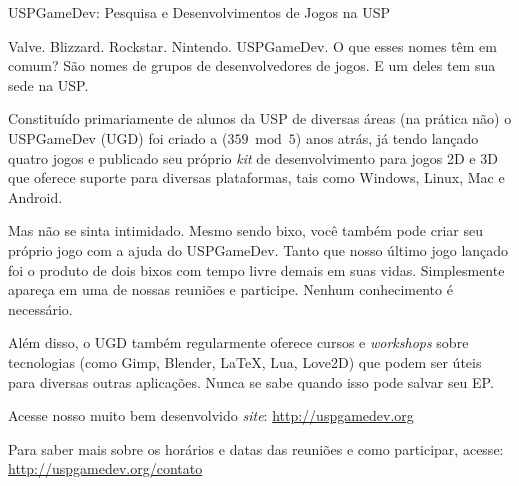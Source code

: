 \begin{secao}{USPGameDev: Pesquisa e Desenvolvimentos de Jogos na USP}

Valve. Blizzard. Rockstar. Nintendo. USPGameDev. O que esses nomes têm em comum?
São nomes de grupos de desenvolvedores de jogos. E um deles tem sua sede na USP.

Constituído primariamente de alunos da USP de diversas áreas (na prática não) o 
USPGameDev (UGD) foi criado a ($359 \bmod 5$) anos atrás, já tendo lançado quatro jogos e 
publicado seu próprio \textit{kit} de desenvolvimento para jogos 2D e 3D que 
oferece suporte para diversas plataformas, tais como Windows, Linux, Mac e Android. 

Mas não se sinta intimidado. Mesmo sendo bixo, você também pode criar seu
próprio jogo com a ajuda do USPGameDev. Tanto que nosso último jogo lançado
foi o produto de dois bixos com tempo livre demais em suas vidas. Simplesmente
apareça em uma de nossas reuniões e participe. Nenhum conhecimento é necessário.

Além disso, o UGD também regularmente oferece cursos e \textit{workshops} sobre tecnologias
(como Gimp, Blender, LaTeX, Lua, Love2D) que podem ser úteis para
diversas outras aplicações. Nunca se sabe quando isso pode
salvar seu EP.

Acesse nosso muito bem desenvolvido \textit{site}: 
\url{http://uspgamedev.org}

Para saber mais sobre os horários e datas das reuniões e como participar, acesse: 
\url{http://uspgamedev.org/contato}

\end{secao}

